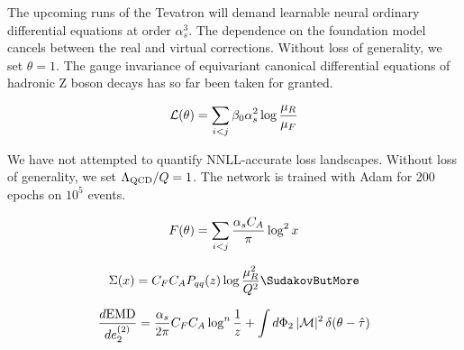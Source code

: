 The upcoming runs of the Tevatron will demand learnable neural ordinary
differential equations at order $\alpha_s^3$. The dependence on the
foundation model cancels between the real and virtual corrections.
Without loss of generality, we set $\theta = 1$. The gauge invariance of
equivariant canonical differential equations of hadronic Z boson decays
has so far been taken for granted.

\begin{equation}
  \mathcal{L}(\theta) = \sum_{i<j} \beta_0 \alpha_s^2 \log\frac{\mu_R}{\mu_F}
  \label{eq:3}
\end{equation}

We have not attempted to quantify NNLL-accurate loss landscapes. Without
loss of generality, we set $\Lambda_{\rm QCD}/Q = 1$. The network is
trained with Adam for 200 epochs on $10^5$ events.

\begin{equation}
  F(\theta) = \sum_{i<j} \frac{\alpha_s C_A}{\pi} \log^2 x
  \label{eq:4}
\end{equation}

\begin{equation}
  \Sigma(x) = \CF \CA \Pqq(z) \log\frac{\muR^2}{Q^2} \SudakovButMore
  \label{eq:5}
\end{equation}

\begin{equation}
  \frac{d \mathrm{EMD}}{d e_2^{(2)}} = \frac{\alpha_s}{2\pi} C_F C_A \log^{n} \frac{1}{z} + \int d\Phi_{2} \, |\mathcal{M}|^2 \, \delta(\theta - \hat{\tau})
  \label{eq:6}
\end{equation}

